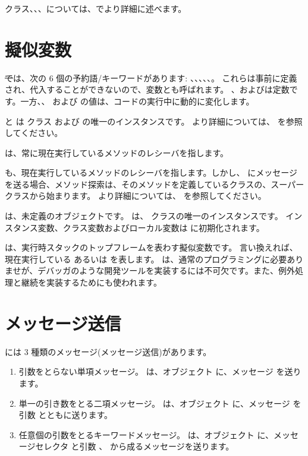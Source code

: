 \documentclass[a4paper,10pt,twoside]{book}
\begin{document}
クラス、、、については、でより詳細に述べます。


\section{擬似変数}

\st では、次の 6 個の予約語/キーワードがあります:
、、、、、。
これらは事前に定義され、代入することができないので、変数とも呼ばれます。
、およびは定数です。一方、、 および  の値は、コードの実行中に動的に変化します。

 と  は  クラス  および  の唯一のインスタンスです。
より詳細については、 を参照してください。

 は、常に現在実行しているメソッドのレシーバを指します。

 も、現在実行しているメソッドのレシーバを指します。しかし、 にメッセージを送る場合、メソッド探索は、そのメソッドを定義しているクラスの、スーパークラスから始まります。
より詳細については、 を参照してください。

 は、未定義のオブジェクトです。
 は、 クラスの唯一のインスタンスです。
インスタンス変数、クラス変数およびローカル変数は  に初期化されます。

 は、実行時スタックのトップフレームを表わす擬似変数です。
言い換えれば、現在実行している  あるいは  を表します。
 は、通常のプログラミングに必要ありませが、デバッガのような開発ツールを実装するには不可欠です。また、例外処理と継続を実装するためにも使われます。

\section{メッセージ送信}

\pharo には 3 種類のメッセージ(メッセージ送信)があります。
\begin{enumerate}
  \item 引数をとらない単項メッセージ。
  は、オブジェクト  に、メッセージ  を送ります。
  \item 単一の引き数をとる二項メッセージ。
  	 は、オブジェクト  に、メッセージ \ct{+} を引数  とともに送ります。
  \item 任意個の引数をとるキーワードメッセージ。
  	 は、オブジェクト  に、メッセージセレクタ
	 と引数 、 から成るメッセージを送ります。
\end{enumerate}
\end{document}
